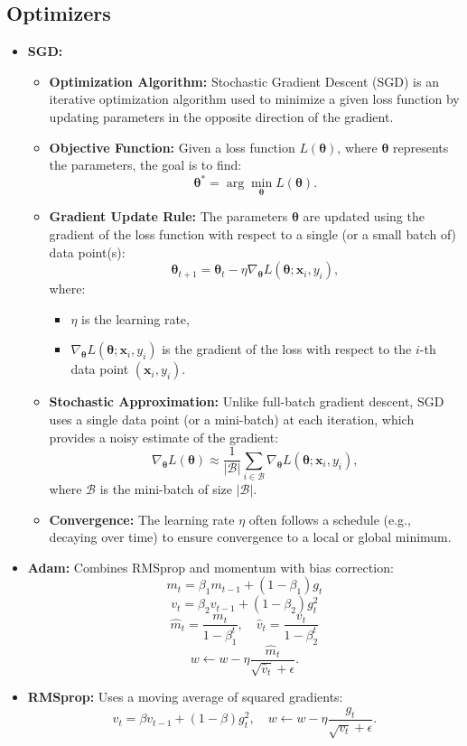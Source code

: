 \documentclass[12pt,a4paper]{article}
\begin{document}
\subsection{Optimizers}
\begin{itemize}
    \item \textbf{SGD:} \begin{itemize}
    \item \textbf{Optimization Algorithm:} Stochastic Gradient Descent (SGD) is an iterative optimization algorithm used to minimize a given loss function by updating parameters in the opposite direction of the gradient.
    
    \item \textbf{Objective Function:} Given a loss function \(L(\mathbf{\theta})\), where \(\mathbf{\theta}\) represents the parameters, the goal is to find:
    \[
    \mathbf{\theta}^* = \arg\min_{\mathbf{\theta}} L(\mathbf{\theta}).
    \]
    
    \item \textbf{Gradient Update Rule:} The parameters \(\mathbf{\theta}\) are updated using the gradient of the loss function with respect to a single (or a small batch of) data point(s):
    \[
    \mathbf{\theta}_{t+1} = \mathbf{\theta}_t - \eta \nabla_{\mathbf{\theta}} L(\mathbf{\theta}; \mathbf{x}_i, y_i),
    \]
    where:
    \begin{itemize}
        \item \(\eta\) is the learning rate,
        \item \(\nabla_{\mathbf{\theta}} L(\mathbf{\theta}; \mathbf{x}_i, y_i)\) is the gradient of the loss with respect to the \(i\)-th data point \((\mathbf{x}_i, y_i)\).
    \end{itemize}
    
    \item \textbf{Stochastic Approximation:} Unlike full-batch gradient descent, SGD uses a single data point (or a mini-batch) at each iteration, which provides a noisy estimate of the gradient:
    \[
    \nabla_{\mathbf{\theta}} L(\mathbf{\theta}) \approx \frac{1}{|\mathcal{B}|} \sum_{i \in \mathcal{B}} \nabla_{\mathbf{\theta}} L(\mathbf{\theta}; \mathbf{x}_i, y_i),
    \]
    where \(\mathcal{B}\) is the mini-batch of size \(|\mathcal{B}|\).
    
    \item \textbf{Convergence:} The learning rate \(\eta\) often follows a schedule (e.g., decaying over time) to ensure convergence to a local or global minimum.
\end{itemize}

    \item \textbf{Adam:} Combines RMSprop and momentum with bias correction:
    \[ m_t = \beta_1 m_{t-1} + (1 - \beta_1) g_t \]
    \[ v_t = \beta_2 v_{t-1} + (1 - \beta_2) g_t^2 \]
    \[ \hat{m}_t = \frac{m_t}{1 - \beta_1^t}, \quad \hat{v}_t = \frac{v_t}{1 - \beta_2^t} \]
    \[ w \leftarrow w - \eta \frac{\hat{m}_t}{\sqrt{\hat{v}_t} + \epsilon}. \]
    \item \textbf{RMSprop:} Uses a moving average of squared gradients:
    \[ v_t = \beta v_{t-1} + (1 - \beta) g_t^2, \quad w \leftarrow w - \eta \frac{g_t}{\sqrt{v_t} + \epsilon}. \]
\end{itemize}
\end{document}
